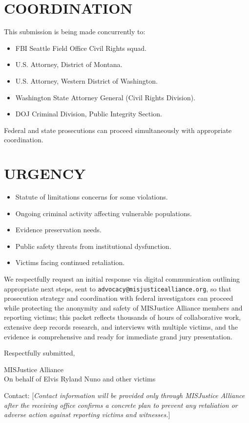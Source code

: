 \documentclass[12pt,oneside]{article}
\begin{document}
\begin{flushleft}
\section*{COORDINATION}

This submission is being made concurrently to:

\begin{itemize}
\item FBI Seattle Field Office Civil Rights squad.
\item U.S. Attorney, District of Montana.
\item U.S. Attorney, Western District of Washington.
\item Washington State Attorney General (Civil Rights Division).
\item DOJ Criminal Division, Public Integrity Section.
\end{itemize}

Federal and state prosecutions can proceed simultaneously with appropriate coordination.

\section*{URGENCY}

\begin{itemize}
\item Statute of limitations concerns for some violations.
\item Ongoing criminal activity affecting vulnerable populations.
\item Evidence preservation needs.
\item Public safety threats from institutional dysfunction.
\item Victims facing continued retaliation.
\end{itemize}

We respectfully request an initial response via digital communication outlining appropriate next steps, sent to \texttt{advocacy@misjusticealliance.org}, so that prosecution strategy and coordination with federal investigators can proceed while protecting the anonymity and safety of MISJustice Alliance members and reporting victims; this packet reflects thousands of hours of collaborative work, extensive deep records research, and interviews with multiple victims, and the evidence is comprehensive and ready for immediate grand jury presentation.

\vspace{0.3in}

\noindent
Respectfully submitted,

\vspace{0.3in}

\noindent
MISJustice Alliance \\
On behalf of Elvis Ryland Nuno and other victims

\vspace{0.2in}

\noindent
Contact: [\textit{Contact information will be provided only through MISJustice Alliance after the receiving office confirms a concrete plan to prevent any retaliation or adverse action against reporting victims and witnesses.}]

\end{flushleft}
\end{document}
